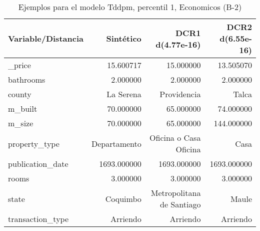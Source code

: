 \begin{table}[H]
\centering
\fontsize{10}{14}\selectfont
\caption{Ejemplos para el modelo Tddpm, percentil 1, Economicos (B-2)}
\label{table-example-economicos-b-2-tddpm_mlp-1p}
\begin{tabular}{|l|r|r|r|}
\hline
\rowcolor[gray]{0.8}
Variable/Distancia & Sintético & DCR1 d(4.77e-16) & DCR2 d(6.55e-16) \\
\hline \_price & \cellcolor[rgb]{0.9, 0.54, 0.52} 15.600717 & 15.000000 & 13.505070 \\
\hline bathrooms & \cellcolor[rgb]{0.9, 0.54, 0.52} 2.000000 & \cellcolor[rgb]{0.9, 0.54, 0.52} 2.000000 & \cellcolor[rgb]{0.9, 0.54, 0.52} 2.000000 \\
\hline county & \cellcolor[rgb]{0.9, 0.54, 0.52} La Serena & Providencia & Talca \\
\hline m\_built & \cellcolor[rgb]{0.9, 0.54, 0.52} 70.000000 & 65.000000 & 74.000000 \\
\hline m\_size & \cellcolor[rgb]{0.9, 0.54, 0.52} 70.000000 & 65.000000 & 144.000000 \\
\hline property\_type & \cellcolor[rgb]{0.9, 0.54, 0.52} Departamento & Oficina o Casa Oficina & Casa \\
\hline publication\_date & \cellcolor[rgb]{0.9, 0.54, 0.52} 1693.000000 & \cellcolor[rgb]{0.9, 0.54, 0.52} 1693.000000 & \cellcolor[rgb]{0.9, 0.54, 0.52} 1693.000000 \\
\hline rooms & \cellcolor[rgb]{0.9, 0.54, 0.52} 3.000000 & \cellcolor[rgb]{0.9, 0.54, 0.52} 3.000000 & \cellcolor[rgb]{0.9, 0.54, 0.52} 3.000000 \\
\hline state & \cellcolor[rgb]{0.9, 0.54, 0.52} Coquimbo & Metropolitana de Santiago & Maule \\
\hline transaction\_type & \cellcolor[rgb]{0.9, 0.54, 0.52} Arriendo & \cellcolor[rgb]{0.9, 0.54, 0.52} Arriendo & \cellcolor[rgb]{0.9, 0.54, 0.52} Arriendo \\
\hline
\end{tabular}
\end{table}
